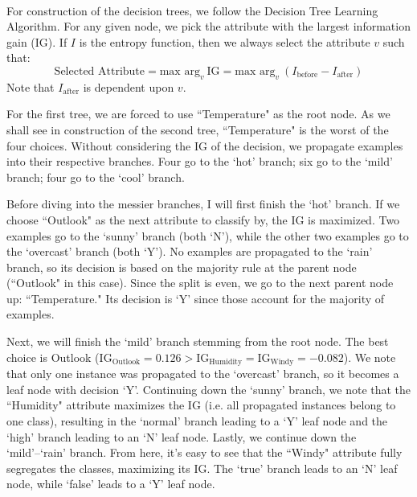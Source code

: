 \documentclass[12pt]{article}
\begin{document}
	\paragraph{}
	For construction of the decision trees, we follow the Decision Tree Learning Algorithm. For any given node, we pick the attribute with the largest information gain (IG). If $I$ is the entropy function, then we always select the attribute $v$ such that:
	\begin{equation*}
	\text{Selected Attribute} = \text{max arg}_{v} \ \text{IG} = \text{max arg}_{v} \ (I_{\text{before}}-I_{\text{after}})
	\end{equation*}
	Note that $I_{\text{after}}$ is dependent upon $v$. \par
	For the first tree, we are forced to use ``Temperature" as the root node. As we shall see in construction of the second tree, ``Temperature" is the worst of the four choices. Without considering the IG of the decision, we propagate examples into their respective branches. Four go to the `hot' branch; six go to the `mild' branch; four go to the `cool' branch. \par
	Before diving into the messier branches, I will first finish the `hot' branch. If we choose ``Outlook" as the next attribute to classify by, the IG is maximized. Two examples go to the `sunny' branch (both `N'), while the other two examples go to the `overcast' branch (both `Y'). No examples are propagated to the `rain' branch, so its decision is based on the majority rule at the parent node (``Outlook" in this case). Since the split is even, we go to the next parent node up: ``Temperature." Its decision is `Y' since those account for the majority of examples. \par
	Next, we will finish the `mild' branch stemming from the root node. The best choice is Outlook ($\text{IG}_{\text{Outlook}} = 0.126 > \text{IG}_{\text{Humidity}} = \text{IG}_{\text{Windy}} = -0.082$). We note that only one instance was propagated to the `overcast' branch, so it becomes a leaf node with decision `Y'. Continuing down the `sunny' branch, we note that the ``Humidity" attribute maximizes the IG (i.e. all propagated instances belong to one class), resulting in the `normal' branch leading to a `Y' leaf node and the `high' branch leading to an `N' leaf node. Lastly, we continue down the `mild'--`rain' branch. From here, it's easy to see that the ``Windy" attribute fully segregates the classes, maximizing its IG. The `true' branch leads to an `N' leaf node, while `false' leads to a `Y' leaf node. \par
\end{document}
